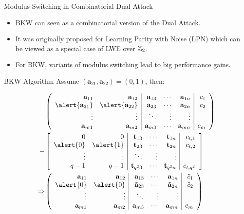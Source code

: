 \documentclass[presentation,smaller]{beamer}
\newcommand{\ZZ}[1][blank]{\ensuremath{\ifthenelse{\equal{#1}{blank}}{\mathbb{Z}}{\mathbb{Z}\left[#1\right]}\xspace}}
\renewcommand{\vec}[1]{\ensuremath{\mathbf{#1}}\xspace}
\newcommand{\shortvec}[1]{\tilde{\mathbf{#1}}\xspace}
\begin{document}
\begin{frame}[label={sec:org1af751c}]{Modulus Switching in Combinatorial Dual Attack}
\begin{itemize}
\item BKW can seen as a combinatorial version of the Dual Attack.
\item It was originally proposed for Learning Parity with Noise (LPN) which can be viewed as a special case of LWE over \(\ZZ_{2}\).
\item For BKW, variants of modulus switching lead to big performance gains.
\end{itemize}
\end{frame}

\begin{frame}[label={sec:org855a2b4}]{BKW Algorithm}
Assume \((\vec{a}_{21},\vec{a}_{22}) = (0, 1)\), then:

\begin{LATEX}
\footnotesize
\begin{align*}
   & \left(
      \begin{array}{rr|rrr|r}
        \phantom{xn}\vec{a}_{11}         & \phantom{xn}\vec{a}_{12}         & \vec{a}_{13} & \cdots & \vec{a}_{1n} & c_1\\
        \alert{\vec{a}_{21}} & \alert{\vec{a}_{22}} & \vec{a}_{23} & \cdots & \vec{a}_{2n} & c_2\\
        \vdots               & \vdots               & \ddots       & \vdots & \vdots\\
        \vec{a}_{m1}         & \vec{a}_{m2}         & \vec{a}_{m3} & \cdots & \vec{a}_{mn} & c_{m}
      \end{array}
                                                                               \right)\\
  -& \left[
      \begin{array}{rr|rrr|r}
        0         & 0         & \vec{t}_{13}   & \cdots & \vec{t}_{1n}   & c_{t,1}\\
        \alert{0} & \alert{1} & \vec{t}_{23}   & \cdots & \vec{t}_{2n}   & c_{t,2}\\
        \vdots    & \vdots    & \ddots         & \vdots & \vdots\\
        q-1       & q-1       & \vec{t}_{q^23} & \cdots & \vec{t}_{q^2n} & c_{t,q^2}
        \end{array}\right]\\
   \Rightarrow &
     \left(\begin{array}{rr|rrr|r}
             \phantom{xn}\vec{a}_{11} & \phantom{xn}\vec{a}_{12} & \vec{a}_{13}      & \cdots & \vec{a}_{1n}      & \tilde{c}_1\\
             \alert{0}    & \alert{0}    & \shortvec{a}_{23} & \cdots & \shortvec{a}_{2n} & \tilde{c}_2\\
             \vdots       & \vdots       & \ddots            & \vdots & \vdots\\
             \vec{a}_{m1} & \vec{a}_{m2} & \vec{a}_{m3}      & \cdots & \vec{a}_{mn}      & c_{m}
           \end{array}\right)
  \end{align*}
\end{LATEX}
\end{frame}
\end{document}
